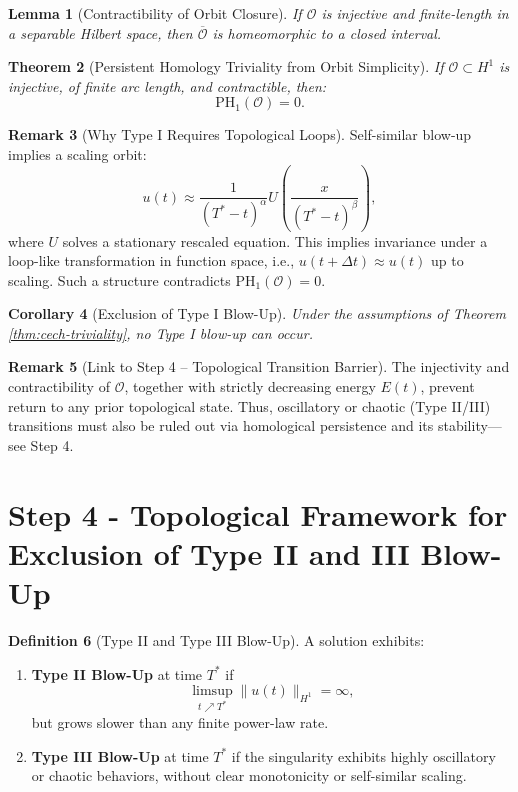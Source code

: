 \documentclass[11pt]{article}
\newtheorem{theorem}{Theorem}[section]
\newtheorem{lemma}[theorem]{Lemma}
\newtheorem{corollary}[theorem]{Corollary}
\theoremstyle{definition}
\newtheorem{definition}[theorem]{Definition}
\newtheorem{remark}[theorem]{Remark}
\begin{document}
\begin{lemma}[Contractibility of Orbit Closure]
If $\mathcal{O}$ is injective and finite-length in a separable Hilbert space, then $\overline{\mathcal{O}}$ is homeomorphic to a closed interval.
\end{lemma}

\begin{theorem}[Persistent Homology Triviality from Orbit Simplicity]\label{thm:ph1-triviality}
If $\mathcal{O} \subset H^1$ is injective, of finite arc length, and contractible, then:
\[
\mathrm{PH}_1(\mathcal{O}) = 0.
\]
\end{theorem}

\begin{remark}[Why Type I Requires Topological Loops]
Self-similar blow-up implies a scaling orbit:
\[
u(t) \approx \frac{1}{(T^*-t)^{\alpha}} U\left( \frac{x}{(T^*-t)^{\beta}} \right),
\]
where $U$ solves a stationary rescaled equation. This implies invariance under a loop-like transformation in function space, i.e., $u(t+\Delta t) \approx u(t)$ up to scaling. Such a structure contradicts $\mathrm{PH}_1(\mathcal{O}) = 0$.
\end{remark}

\begin{corollary}[Exclusion of Type I Blow-Up]
Under the assumptions of Theorem \ref{thm:cech-triviality}, no Type I blow-up can occur.
\end{corollary}

\begin{remark}[Link to Step 4 – Topological Transition Barrier]
The injectivity and contractibility of $\mathcal{O}$, together with strictly decreasing energy $E(t)$, prevent return to any prior topological state. Thus, oscillatory or chaotic (Type II/III) transitions must also be ruled out via homological persistence and its stability—see Step 4.
\end{remark}


\section{Step 4 - Topological Framework for Exclusion of Type II and III Blow-Up}
\label{sec:step4}

\begin{definition}[Type II and Type III Blow-Up]
A solution exhibits:
\begin{enumerate}
  \item \textbf{Type II Blow-Up} at time $T^*$ if
  \[
  \limsup_{t \nearrow T^*} \|u(t)\|_{H^1} = \infty,
  \]
  but grows slower than any finite power-law rate.

  \item \textbf{Type III Blow-Up} at time $T^*$ if the singularity exhibits highly oscillatory or chaotic behaviors, without clear monotonicity or self-similar scaling.
\end{enumerate}
\end{definition}
\end{document}
